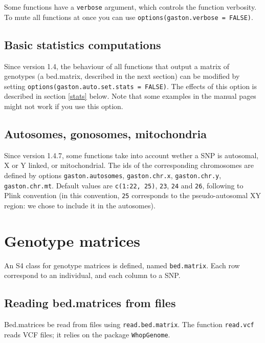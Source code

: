 \documentclass{article}
\begin{document}
  Some functions have a \verb!verbose! argument, which controls the
  function verbosity. To mute all functions at once you can use 
  \verb!options(gaston.verbose = FALSE)!.

\subsection{Basic statistics computations}

  Since version 1.4, the behaviour of all functions that output a
  matrix of genotypes (a bed.matrix, described in the next section)
  can be modified by setting \verb!options(gaston.auto.set.stats = FALSE)!.
  The effects of this option is described in section \ref{stats}
  below. Note that some examples in the manual pages might not work if
  you use this option.

\subsection{Autosomes, gonosomes, mitochondria}

  Since version 1.4.7, some functions take into account wether a SNP 
  is autosomal, X or Y linked, or mitochondrial. The ids of the corresponding
  chromosomes are defined by options \verb!gaston.autosomes!, \verb!gaston.chr.x!,
  \verb!gaston.chr.y!, \verb!gaston.chr.mt!. Default values are \verb!c(1:22, 25)!,
  \verb!23!, \verb!24! and \verb!26!, following to Plink convention (in this
  convention, \verb!25! corresponds to the pseudo-autosomal XY region: we chose
  to include it in the autosomes).

\section{Genotype matrices}

  An S4 class for genotype matrices is defined, named \verb!bed.matrix!.
  Each row correspond to an individual, and each column to a SNP. 

\subsection{Reading bed.matrices from files}

  Bed.matrices be read from files using \verb!read.bed.matrix!.
  The function \verb!read.vcf! reads VCF files; it relies on the package \verb!WhopGenome!.
\end{document}
